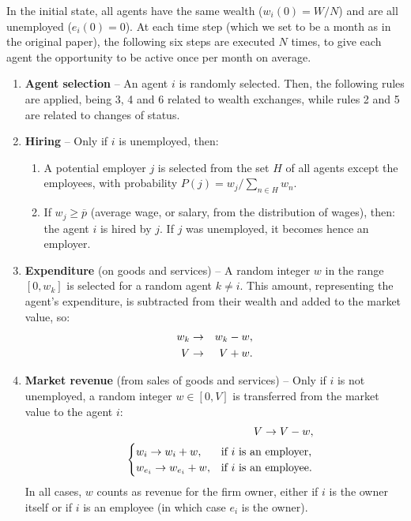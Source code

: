 \documentclass[11pt,a4paper]{revtex4-1}
\begin{document}
In the initial state, all agents have the same wealth ($w_i(0)={W}/N$) and are all unemployed ($e_i(0)=0$).
At each time step (which we set to be a month as in the original paper), the following six steps are executed $N$ times, to give each agent the opportunity to be active once per month on average. 


\begin{enumerate}[leftmargin=*]
%
\item  
{\bf Agent selection} --  
An agent $i$ is randomly selected. 
Then, the following rules are applied, being 3, 4 and 6 related to wealth exchanges, while rules 2 and 5 are related to changes of status.  
%
\item {\bf Hiring} -- Only if $i$ is unemployed, then:
\begin{enumerate}[leftmargin=*]
 \item A potential employer $j$ is selected from the set $H$  of all agents except the employees, with probability  $P (j)= w_{j}/\sum_{n\in H}w_{n}$. 
 
\item   If $ w_j \ge \overline{p}$ (average wage, or salary, from the distribution of wages), then: 
the agent $i$ is hired by $j$.   
If $j$ was unemployed, it becomes hence an employer.

\end{enumerate}
% 
%
\item  
{\bf  Expenditure} (on goods and services) --
A random integer $w$ in the range  $\left[0,w_{k}\right]$  is selected for a random agent  $k\neq i$. This amount, representing the agent's expenditure, is subtracted from their wealth and added to the market value, so:
\begin{eqnarray} \notag
w_k  &\to& w_k-w, \\ \notag 
V &\to& V+w.
\end{eqnarray}
 
 
\item 
{\bf Market revenue} (from sales of goods and services) -- Only if $i$  is not unemployed, a random integer $w \in [0, V]$ is  transferred from the market value to the agent $i$:   
%
\begin{eqnarray}   \notag
   && V \to V - w, \\  \notag
%   
&& \begin{cases} 
  w_i \to w_i + w,         &\mbox{if  $i$ is an employer,}\\
  w_{e_i} \to w_{e_i} + w, &\mbox{if  $i$ is an employee.} 
\end{cases}
\end{eqnarray}
%
 In all cases,  $w$ counts as revenue for the firm owner, either if $i$ is the owner itself or if $i$ is an employee (in which case $e_i$ is the owner). 



\end{enumerate}
\end{document}
